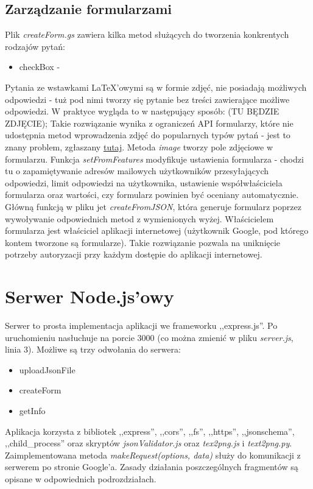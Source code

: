\subsection{Zarządzanie formularzami}
Plik \textit{createForm.gs} zawiera kilka metod służących do tworzenia konkrentych rodzajów pytań:
\begin{itemize} %
\item checkBox - 
\end{itemize}
Pytania ze wstawkami \LaTeX{}'owymi są w formie zdjęć, nie posiadają możliwych odpowiedzi - tuż pod nimi tworzy się pytanie bez treści zawierające możliwe odpowiedzi. W praktyce wygląda to w następujący sposób: (TU BĘDZIE ZDJĘCIE);
Takie rozwiązanie wynika z ograniczeń  API formularzy, które nie udostępnia metod wprowadzenia zdjęć do popularnych typów pytań - jest to znany problem, zgłaszany \href{https://issuetracker.google.com/issues/36765518?pli=1}{tutaj}. Metoda \textit{image} tworzy pole zdjęciowe w formularzu. 
Funkcja \textit{setFromFeatures} modyfikuje ustawienia formularza - chodzi tu o zapamiętywanie adresów mailowych użytkowników przesyłających odpowiedzi, limit odpowiedzi na użytkownika, ustawienie współwłaściciela formularza oraz wartości, czy formularz powinien być oceniany automatycznie.
\ind Główną funkcją w pliku jet \textit{createFromJSON}, która generuje formularz poprzez wywoływanie odpowiednich metod z wymienionych wyżej. Właścicielem formularza jest właściciel aplikacji internetowej (użytkownik Google, pod którego  kontem tworzone są formularze). Takie rozwiązanie pozwala na uniknięcie potrzeby autoryzacji przy każdym dostępie do aplikacji internetowej.
\section{Serwer Node.js'owy}
Serwer to prosta implementacja aplikacji we frameworku ,,express.js''. Po uruchomieniu nasłuchuje na porcie 3000 (co można zmienić w pliku \textit{server.js}, linia 3). Możliwe są trzy odwołania do serwera:
\begin{itemize}
\item uploadJsonFile
\item createForm
\item getInfo
\end{itemize}
Aplikacja korzysta z bibliotek ,,express'', ,,cors'', ,,fs'', ,,https'', ,,jsonschema'', ,,child\_process''  oraz skryptów \textit{jsonValidator.js} oraz \textit{tex2png.js} i \textit{text2png.py}.
Zaimplementowana metoda \textit{makeRequest(options, data)} służy do komunikacji z serwerem po stronie Google'a.
\ind Zasady działania poszczególnych fragmentów są opisane w odpowiednich podrozdziałach.
